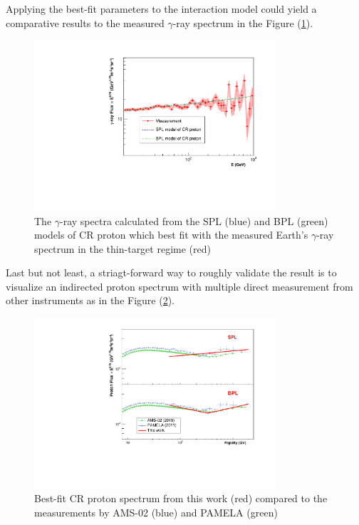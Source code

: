 Applying the best-fit parameters to the interaction model could yield a comparative results
to the measured $\gamma$-ray spectrum in the Figure (\ref{fig:bestfittedgamma}).

\begin{figure}[h!]
    \centering
    \includegraphics[width=0.8\textwidth]{img/fitted_result.pdf}
    \caption{
        The $\gamma$-ray spectra calculated from the SPL (blue) and BPL (green) models of CR proton
        which best fit with the measured Earth’s $\gamma$-ray spectrum in the thin-target regime
        (red)
    }
    \label{fig:bestfittedgamma}
\end{figure}

Last but not least, a striagt-forward way to roughly validate the result is to visualize
an indirected proton spectrum with multiple direct measurement from other instruments as in 
the Figure (\ref{fig:bestfittedproton}).

\begin{figure}[h!]
    \centering
    \includegraphics[width=0.8\textwidth]{img/ProtonSpectrumModelMeasurement}
    \caption{Best-fit CR proton spectrum from this work (red) compared to the measurements
    by AMS-02 (blue) and PAMELA (green)}
    \label{fig:bestfittedproton}
\end{figure}

